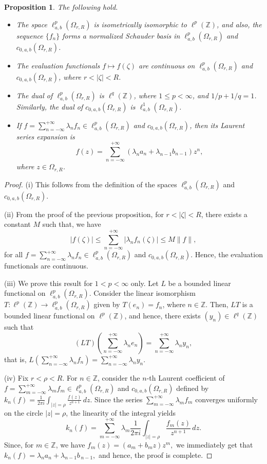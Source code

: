 \documentclass[12pt, reqno]{amsart}
\newtheorem{proposition}[theorem]{Proposition}
\theoremstyle{definition}
\theoremstyle{remark}
\numberwithin{equation}{section}
\begin{document}
\begin{proposition}\label{duality}
The following hold.
\begin{itemize}
   \item[(i)] The space $\ell^p_{a,b}(\Omega_{r,R})$ is isometrically isomorphic to $\ell^p(\mathbb{Z})$, and also, the sequence $\{f_n\}$ forms a normalized Schauder basis in $\ell^p_{a,b}(\Omega_{r,R})$ and $c_{0,a,b}(\Omega_{r,R})$.
   \item[(ii)] The evaluation functionals $f\mapsto f(\zeta)$ are continuous on $\ell^p_{a,b}(\Omega_{r,R})$ and $c_{0,a,b}(\Omega_{r,R})$, where $r<|\zeta|<R$. 
   \item[(iii)] The dual of $\ell^p_{a,b}(\Omega_{r,R})$ is $\ell^q(\mathbb{Z})$, where $1\leq p<\infty$, and $1/p+1/q=1$. Similarly, the dual of $c_{0,a,b}(\Omega_{r,R})$ is $\ell^1_{a,b}(\Omega_{r,R})$.
   \item[(iv)] If $f=\sum_{n=-\infty}^{+\infty}\lambda_n f_n \in \ell^p_{a,b}(\Omega_{r,R})$ and $c_{0,a,b}(\Omega_{r,R})$, then its Laurent series expansion is 
   \[
   f(z)=\sum_{n=-\infty}^{+\infty} (\lambda_na_n+\lambda_{n-1}b_{n-1})z^n,
\]
where $z\in \Omega_{r,R}$.
    \end{itemize}
\end{proposition}
\begin{proof}
(i) This follows from the definition of the spaces $\ell^p_{a,b}(\Omega_{r,R})$ and $c_{0,a,b}(\Omega_{r,R})$. 

(ii) From the proof of the previous proposition, for $r<|\zeta|<R$, there exists a constant $M$ such that, 
   we have 
   \[
   |f(\zeta)|\leq \sum_{n=-\infty}^{+\infty} \lvert \lambda_{n}f_{n}(\zeta)\rvert\leq M\|f\|,
   \]
   for all $f=\sum_{n=-\infty}^{+\infty}\lambda_n f_n \in \ell^p_{a,b}(\Omega_{r,R})$ and $c_{0,a,b}(\Omega_{r,R})$. Hence, the evaluation functionals are continuous.
   
   (iii) We prove this result for $1<p<\infty$ only. Let $L$ be a bounded linear functional on $\ell^p_{a,b}(\Omega_{r,R})$. Consider the linear isomorphism $T:\ell^p(\mathbb{Z})\rightarrow \ell^p_{a,b}(\Omega_{r,R})$ given by $T(e_n)=f_n$, where $n\in \mathbb{Z}$. Then, $LT$ is a bounded linear functional on $\ell^p(\mathbb{Z})$, and hence, there exists $(y_n)\in \ell^q(\mathbb{Z})$ such that 
   \[
   (LT)(\sum_{n=-\infty}^{+\infty} \lambda_n e_n)=\sum_{n=-\infty}^{+\infty} \lambda_n y_n,
   \]
   that is, $L(\sum_{n=-\infty}^{+\infty} \lambda_n f_n)=\sum_{n=-\infty}^{+\infty} \lambda_n y_n$.
   
   (iv)
Fix $r<\rho<R$. For $n\in\mathbb{Z}$, consider the $n$-th Laurent coefficient of $f=\sum_{m=-\infty}^{+\infty}\lambda_m f_m \in \ell^{p}_{a,b}(\Omega_{r,R})$ and $c_{0,a,b}(\Omega_{r,R})$ defined by
$
k_n(f)
=\frac{1}{2\pi i}\int_{|z|=\rho}\frac{f(z)}{z^{n+1}}\,dz.
$
Since the series $\sum_{m=-\infty}^{+\infty}\lambda_m f_m$ converges uniformly on
the circle $|z|=\rho$, the linearity of the integral yields
\[
k_n(f)
=\sum_{m=-\infty}^{+\infty}\lambda_m
\frac{1}{2\pi i}\int_{|z|=\rho}\frac{f_m(z)}{z^{n+1}}\,dz.
\]
Since, for $m\in\mathbb{Z}$, we have $f_m(z)=(a_m+b_m z)z^m,$ we immediately get that
$
k_n(f)
=\lambda_n a_n+\lambda_{n-1}b_{\,n-1},
$
and hence, the proof is complete.
\end{proof}
\end{document}
